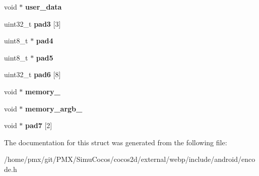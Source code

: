 \begin{DoxyCompactItemize}
void $\ast$ {\bfseries user\+\_\+data}
\item 
\mbox{\label{structWebPPicture_a796ad7d6eeeabb2bc036dd83760646e4}} 
uint32\+\_\+t {\bfseries pad3} \mbox{[}3\mbox{]}
\item 
\mbox{\label{structWebPPicture_a7e0f673a491b0ce9a64b915df0166941}} 
uint8\+\_\+t $\ast$ {\bfseries pad4}
\item 
\mbox{\label{structWebPPicture_a85e1dc0c49810c5cf94b5d5adf204b5e}} 
uint8\+\_\+t $\ast$ {\bfseries pad5}
\item 
\mbox{\label{structWebPPicture_a77981472f6bc228dbaa5ad71fba2d3a7}} 
uint32\+\_\+t {\bfseries pad6} \mbox{[}8\mbox{]}
\item 
\mbox{\label{structWebPPicture_a10abb3b83908136c287883e85e8c4009}} 
void $\ast$ {\bfseries memory\+\_\+}
\item 
\mbox{\label{structWebPPicture_a3120fb3a59ea3d318466b37b5969eabd}} 
void $\ast$ {\bfseries memory\+\_\+argb\+\_\+}
\item 
\mbox{\label{structWebPPicture_ab243239702a5172ec447996482ba0d9b}} 
void $\ast$ {\bfseries pad7} \mbox{[}2\mbox{]}
\end{DoxyCompactItemize}


The documentation for this struct was generated from the following file\+:\begin{DoxyCompactItemize}
\item 
/home/pmx/git/\+P\+M\+X/\+Simu\+Cocos/cocos2d/external/webp/include/android/encode.\+h\end{DoxyCompactItemize}
